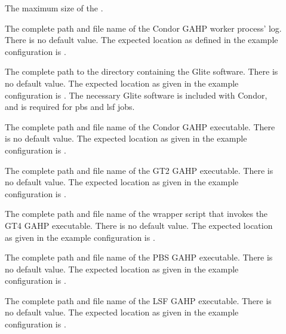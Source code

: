 \begin{description}
\item[]
\label{param:MaxCGAHPLog} The maximum size of the .

\item[]
\label{param:CGAHPWorkerThreadLog} The complete path and file name of the
Condor GAHP worker process' log.
There is no default value. The expected location as defined
in the example configuration is .

\item[]
\label{param:GLITELocation} The complete path to the directory
containing the Glite software.
There is no default value. The expected location as given
in the example configuration is .
The necessary Glite software is included with Condor,
and is required for pbs and lsf jobs.

\item[]
\label{param:CondorGAHP} The complete path and file name of the
Condor GAHP executable.
There is no default value. The expected location as given
in the example configuration is .

\item[]
\label{param:GT2GAHP} The complete path and file name of the
GT2 GAHP executable.
There is no default value. The expected location as given
in the example configuration is .

\item[]
\label{param:GT4GAHP} The complete path and file name of the
wrapper script that invokes the GT4 GAHP executable.
There is no default value. The expected location as given
in the example configuration is .

\item[]
\label{param:PBSGAHP} The complete path and file name of the
PBS GAHP executable.
There is no default value. The expected location as given
in the example configuration is .

\item[]
\label{param:LSFGAHP} The complete path and file name of the
LSF GAHP executable.
There is no default value. The expected location as given
in the example configuration is .


\end{description}

